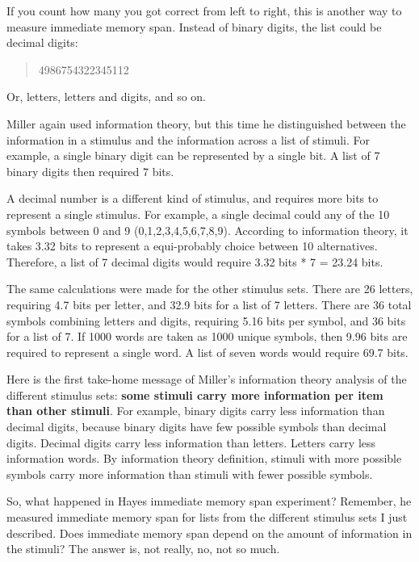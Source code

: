 \documentclass[
  oneside,
  12pt]{crumpbook}
\begin{document}
If you count how many you got correct from left to right, this is another way to measure immediate memory span. Instead of binary digits, the list could be decimal digits:

\begin{quote}
4986754322345112
\end{quote}

Or, letters, letters and digits, and so on.

Miller again used information theory, but this time he distinguished between the information in a stimulus and the information across a list of stimuli. For example, a single binary digit can be represented by a single bit. A list of 7 binary digits then required 7 bits.

A decimal number is a different kind of stimulus, and requires more bits to represent a single stimulus. For example, a single decimal could any of the 10 symbols between 0 and 9 (0,1,2,3,4,5,6,7,8,9). According to information theory, it takes 3.32 bits to represent a equi-probably choice between 10 alternatives. Therefore, a list of 7 decimal digits would require 3.32 bits * 7 = 23.24 bits.

The same calculations were made for the other stimulus sets. There are 26 letters, requiring 4.7 bits per letter, and 32.9 bits for a list of 7 letters. There are 36 total symbols combining letters and digits, requiring 5.16 bits per symbol, and 36 bits for a list of 7. If 1000 words are taken as 1000 unique symbols, then 9.96 bits are required to represent a single word. A list of seven words would require 69.7 bits.

Here is the first take-home message of Miller's information theory analysis of the different stimulus sets: \textbf{some stimuli carry more information per item than other stimuli}. For example, binary digits carry less information than decimal digits, because binary digits have few possible symbols than decimal digits. Decimal digits carry less information than letters. Letters carry less information words. By information theory definition, stimuli with more possible symbols carry more information than stimuli with fewer possible symbols.

So, what happened in Hayes immediate memory span experiment? Remember, he measured immediate memory span for lists from the different stimulus sets I just described. Does immediate memory span depend on the amount of information in the stimuli? The answer is, not really, no, not so much.
\end{document}
